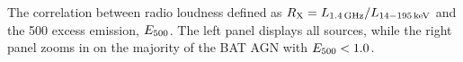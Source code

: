 \label{fig:excess_vs_rx} The correlation between radio loudness defined as $R_{\rm X} = L_{\rm 1.4\,GHz}/L_{\rm 14-195\, keV}$ and the 500 \um{} excess emission, $E_{\rm 500}$. The left panel displays all sources, while the right panel zooms in on the majority of the BAT AGN with $E_{\rm 500} < 1.0$.  
  
  